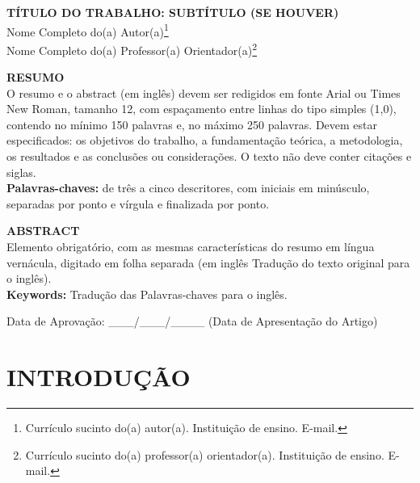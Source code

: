 \documentclass[12pt, a4paper]{article}
\begin{document}
\pagestyle{plain}
\setcounter{page}{4}

\begin{center}
    \textbf{\MakeUppercase{Título do Trabalho: Subtítulo (se houver)}} \\[1cm]
    
    Nome Completo do(a) Autor(a)\footnote{Currículo sucinto do(a) autor(a). Instituição de ensino. E-mail.} \\
    Nome Completo do(a) Professor(a) Orientador(a)\footnote{Currículo sucinto do(a) professor(a) orientador(a). Instituição de ensino. E-mail.}
\end{center}

\vspace{1cm}

\noindent\textbf{RESUMO}\\[0.3cm]
\noindent O resumo e o abstract (em inglês) devem ser redigidos em fonte Arial ou Times New Roman, tamanho 12, com espaçamento entre linhas do tipo simples (1,0), contendo no mínimo 150 palavras e, no máximo 250 palavras. Devem estar especificados: os objetivos do trabalho, a fundamentação teórica, a metodologia, os resultados e as conclusões ou considerações. O texto não deve conter citações e siglas.\\[0.3cm]
\textbf{Palavras-chaves:} de três a cinco descritores, com iniciais em minúsculo, separadas por ponto e vírgula e finalizada por ponto.

\vspace{0.8cm}
\noindent\textbf{ABSTRACT}\\[0.3cm]
\noindent Elemento obrigatório, com as mesmas características do resumo em língua vernácula, digitado em folha separada (em inglês Tradução do texto original para o inglês).\\[0.3cm]
\textbf{Keywords:} Tradução das Palavras-chaves para o inglês.

\vspace{0.8cm}
\noindent Data de Aprovação: \_\_\_/\_\_\_/\_\_\_\_ \hfill (Data de Apresentação do Artigo)

\vspace{1cm}

\section{INTRODUÇÃO}
\end{document}
